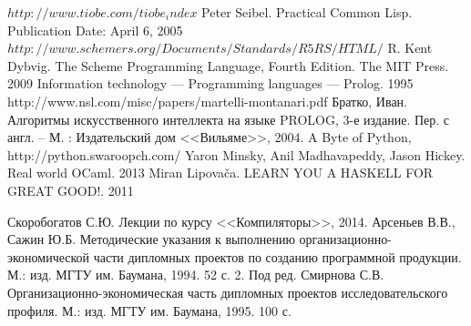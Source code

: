 \begin{thebibliography}{0}
    $http://www.tiobe.com/tiobe_index$
    Peter Seibel. Practical Common Lisp. Publication Date: April 6, 2005
    $http://www.schemers.org/Documents/Standards/R5RS/HTML/$
    R. Kent Dybvig. The Scheme Programming Language, Fourth Edition. The MIT Press. 2009
    Information technology — Programming languages — Prolog. 1995
    http://www.nsl.com/misc/papers/martelli-montanari.pdf
    Братко, Иван. Алгоритмы искусственного интеллекта на языке PROLOG, 3-е издание. Пер. с англ. -- М. : Издательский дом <<Вильяме>>, 2004.
    A Byte of Python, http://python.swaroopch.com/
    Yaron Minsky, Anil Madhavapeddy, Jason Hickey. Real world OCaml. 2013
    Miran Lipovača. LEARN YOU A HASKELL FOR GREAT GOOD!. 2011 

     Скоробогатов С.Ю. Лекции по курсу <<Компиляторы>>, 2014.
     Арсеньев В.В., Сажин Ю.Б. Методические указания к выполнению организационно-экономической части дипломных проектов по созданию программной продукции. М.: изд. МГТУ им. Баумана, 1994. 52 с. 2.
     Под ред. Смирнова С.В. Организационно-экономическая часть дипломных проектов исследовательского профиля. М.: изд. МГТУ им. Баумана, 1995. 100 с.
\end{thebibliography}
